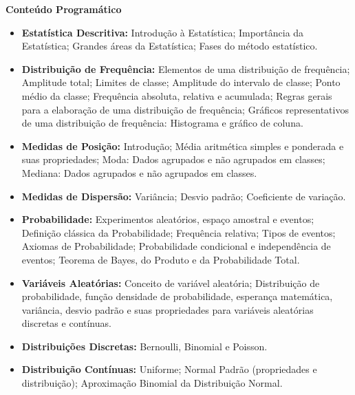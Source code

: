 
\begin{snugshade}\begin{center}\textbf{
    Conteúdo Programático
}\end{center}\end{snugshade}

\begin{itemize}

 \item \textbf{Estatística Descritiva:} Introdução à Estatística; Importância da Estatística; Grandes áreas da Estatística; Fases do método estatístico.
 
 \item \textbf{Distribuição de Frequência:} Elementos de uma distribuição de frequência; Amplitude total; Limites de classe; Amplitude do intervalo de classe; Ponto médio da classe; Frequência absoluta, relativa e acumulada; Regras gerais para a elaboração de uma distribuição de frequência; Gráficos representativos de uma distribuição de frequência: Histograma e gráfico de coluna.
 
 \item \textbf{Medidas de Posição:} Introdução; Média aritmética simples e ponderada e suas propriedades; Moda: Dados agrupados e não  agrupados em classes; Mediana: Dados agrupados e não agrupados em classes.
 
 \item \textbf{Medidas de Dispersão:} Variância; Desvio padrão; Coeficiente de variação.
 
 \item \textbf{Probabilidade:} Experimentos aleatórios, espaço amostral e eventos; Definição clássica da Probabilidade; Frequência relativa; Tipos de eventos; Axiomas de Probabilidade; Probabilidade condicional e independência de eventos; Teorema de Bayes, do Produto e da Probabilidade Total.
 
 \item \textbf{Variáveis Aleatórias:} Conceito de variável aleatória; Distribuição de probabilidade, função densidade de probabilidade, esperança matemática, variância, desvio padrão e suas propriedades para variáveis aleatórias discretas e contínuas.
 
 \item \textbf{Distribuições Discretas:} Bernoulli, Binomial e Poisson.
 
 \item \textbf{Distribuição Contínuas:} Uniforme; Normal Padrão (propriedades e distribuição); Aproximação Binomial da Distribuição Normal.
 

\end{itemize}
